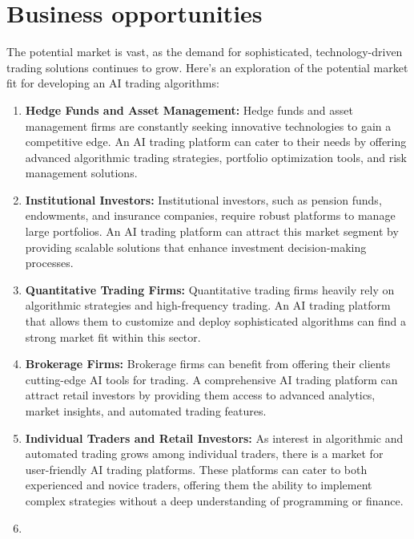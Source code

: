 \documentclass[
  letterpaper,
  DIV=11,
  numbers=noendperiod]{scrreprt}
\begin{document}
\section*{Business opportunities}\label{business-opportunities}


The potential market is vast, as the demand for sophisticated,
technology-driven trading solutions continues to grow. Here's an
exploration of the potential market fit for developing an AI trading
algorithms:

\begin{enumerate}
\def\labelenumi{\arabic{enumi}.}
\item
  \textbf{Hedge Funds and Asset Management:} Hedge funds and asset
  management firms are constantly seeking innovative technologies to
  gain a competitive edge. An AI trading platform can cater to their
  needs by offering advanced algorithmic trading strategies, portfolio
  optimization tools, and risk management solutions.
\item
  \textbf{Institutional Investors:} Institutional investors, such as
  pension funds, endowments, and insurance companies, require robust
  platforms to manage large portfolios. An AI trading platform can
  attract this market segment by providing scalable solutions that
  enhance investment decision-making processes.
\item
  \textbf{Quantitative Trading Firms:} Quantitative trading firms
  heavily rely on algorithmic strategies and high-frequency trading. An
  AI trading platform that allows them to customize and deploy
  sophisticated algorithms can find a strong market fit within this
  sector.
\item
  \textbf{Brokerage Firms:} Brokerage firms can benefit from offering
  their clients cutting-edge AI tools for trading. A comprehensive AI
  trading platform can attract retail investors by providing them access
  to advanced analytics, market insights, and automated trading
  features.
\item
  \textbf{Individual Traders and Retail Investors:} As interest in
  algorithmic and automated trading grows among individual traders,
  there is a market for user-friendly AI trading platforms. These
  platforms can cater to both experienced and novice traders, offering
  them the ability to implement complex strategies without a deep
  understanding of programming or finance.
\item

\end{enumerate}
\end{document}

